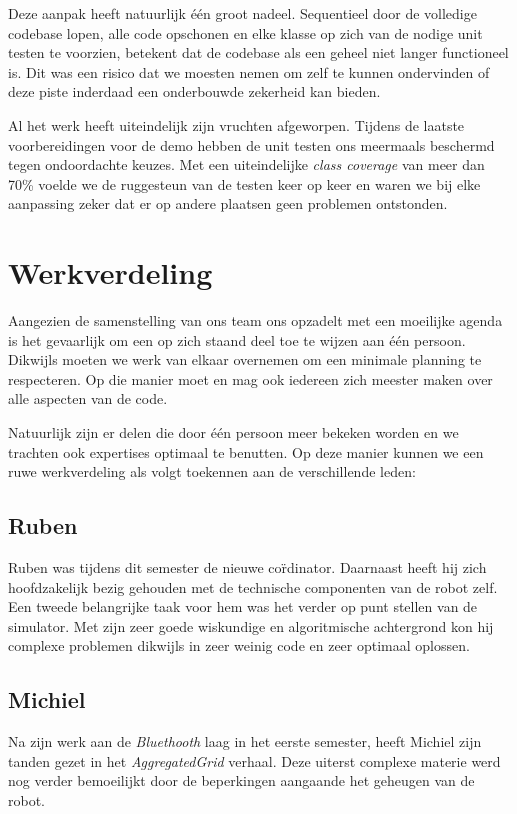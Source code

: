 \documentclass[12pt,a4paper]{report}
\begin{document}
Deze aanpak heeft natuurlijk \'e\'en groot nadeel. Sequentieel door de volledige codebase lopen, alle code opschonen en elke klasse op zich van de nodige unit testen te voorzien, betekent dat de codebase als een geheel niet langer functioneel is. Dit was een risico dat we moesten nemen om zelf te kunnen ondervinden of deze piste inderdaad een onderbouwde zekerheid kan bieden.

Al het werk heeft uiteindelijk zijn vruchten afgeworpen. Tijdens de laatste voorbereidingen voor de demo hebben de unit testen ons meermaals beschermd tegen ondoordachte keuzes. Met een uiteindelijke \emph{class coverage} van meer dan 70\% voelde we de ruggesteun van de testen keer op keer en waren we bij elke aanpassing zeker dat er op andere plaatsen geen problemen ontstonden.

\chapter{Werkverdeling}

Aangezien de samenstelling van ons team ons opzadelt met een moeilijke agenda is het gevaarlijk om een op zich staand deel toe te wijzen aan \'e\'en persoon. Dikwijls moeten we werk van elkaar overnemen om een minimale planning te respecteren. Op die manier moet en mag ook iedereen zich meester maken over alle aspecten van de code.

Natuurlijk zijn er delen die door \'e\'en persoon meer bekeken worden en we trachten ook expertises optimaal te benutten. Op deze manier kunnen we een ruwe werkverdeling als volgt toekennen aan de verschillende leden:

\section{Ruben}

Ruben was tijdens dit semester de nieuwe co\"rdinator. Daarnaast heeft hij zich hoofdzakelijk bezig gehouden met de technische componenten van de robot zelf. Een tweede belangrijke taak voor hem was het verder op punt stellen van de simulator. Met zijn zeer goede wiskundige en algoritmische achtergrond kon hij complexe problemen dikwijls in zeer weinig code en zeer optimaal oplossen.

\section{Michiel}

Na zijn werk aan de \emph{Bluethooth} laag in het eerste semester, heeft Michiel zijn tanden gezet in het \emph{AggregatedGrid} verhaal. Deze uiterst complexe materie werd nog verder bemoeilijkt door de beperkingen aangaande het geheugen van de robot.
\end{document}
